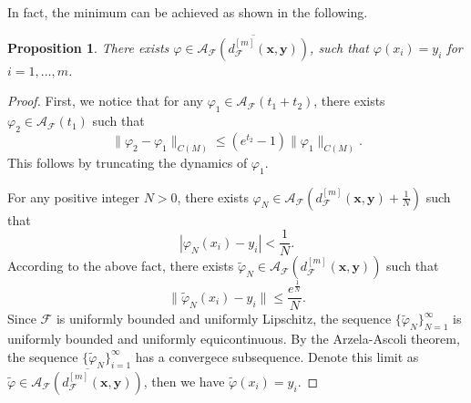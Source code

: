 \documentclass[12pt]{amsart}
\numberwithin{equation}{section}
\newtheorem{proposition}{Proposition}[section]
\theoremstyle{remark}
\begin{document}
In fact, the minimum can be achieved as shown in the following.
\begin{proposition}
  \label{prop:distance-attained}
There exists $\varphi \in \overline{\mathcal A_{\mathcal F}(d_{\mathcal F}^{[m]}(\mathbf x, \mathbf y))}$, such that $\varphi(x_i)=y_i$
for $i=1,\dots,m$.
\end{proposition}
\begin{proof}
First, we notice that for any $\varphi_1\in \mathcal A_{\mathcal F}(t_1+t_2)$, there exists $\varphi_2\in \mathcal A_{\mathcal F}(t_1)$ such that
\begin{equation}
    \|\varphi_2-\varphi_1\|_{C(M)}\le (e^{t_2}-1)\|\varphi_1\|_{C(M)}.
\end{equation}
This follows by truncating the dynamics of $\varphi_1$.

For any positive integer $N>0$, there exists $ \varphi_N\in {\mathcal A_{\mathcal F}(d_{\mathcal F}^{[m]}(\mathbf x,\mathbf y)+\frac{1}{N})}$ such that
\begin{equation}
    |\varphi_N(x_i)-y_i|<\frac{1}{N}.
\end{equation}
According to the above fact, there exists $\tilde \varphi_N\in \mathcal A_{\mathcal F}(d_{\mathcal F}^{[m]}(\mathbf x,\mathbf y))$ such that
\begin{equation}
    \|\tilde \varphi_N(x_i) - y_i\|\le \frac{e^{\frac 1 N}}{N}.
\end{equation}
Since $\mathcal F$ is uniformly bounded and uniformly Lipschitz, the sequence $\{\tilde \varphi_N\}_{N=1}^\infty$ is uniformly bounded and uniformly equicontinuous.
By the Arzela-Ascoli theorem, the sequence $\{\tilde \varphi_N\}_{i=1}^\infty$ has a convergece subsequence. Denote this limit as $\tilde \varphi \in \overline{\mathcal A_{\mathcal F}(d_{\mathcal F}^{[m]}(\mathbf x, \mathbf y))}$, then we have $\tilde \varphi(x_i)= y_i$.
\end{proof}


\end{document}
